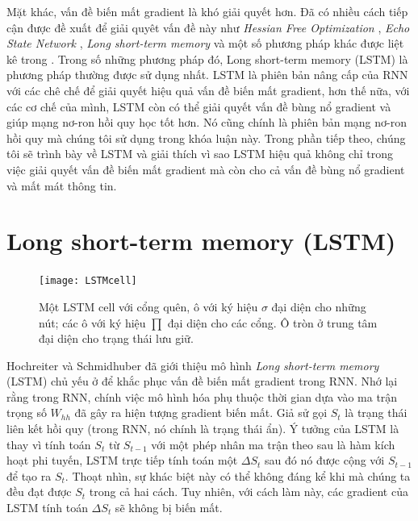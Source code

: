 Mặt khác, vấn đề biến mất gradient là khó giải quyết hơn. Đã có nhiều cách tiếp cận được đề xuất để giải quyêt vấn đề này như \textit{Hessian Free Optimization} \cite{martens2011}, \textit{Echo State Network} \cite{jaeger2007}, \textit{Long short-term memory} \cite{hochreiter1997} và một số phương pháp khác được liệt kê trong \cite{bengio2013}. Trong số những phương pháp đó, Long short-term memory (LSTM) là phương pháp thường được sử dụng nhất. LSTM là phiên bản nâng cấp của RNN với các chê chế để giải quyết hiệu quả vấn đề biến mất gradient, hơn thế nữa, với các cơ chế của mình, LSTM còn có thể giải quyết vấn đề bùng nổ gradient và giúp mạng nơ-ron hồi quy học tốt hơn. Nó cũng chính là phiên bản mạng nơ-ron hồi quy mà chúng tôi sử dụng trong khóa luận này. Trong phần tiếp theo, chúng tôi sẽ trình bày về LSTM và giải thích vì sao LSTM hiệu quả không chỉ trong việc giải quyết vấn đề biến mất gradient mà còn cho cả vấn đề bùng nổ gradient và mất mát thông tin.

\section{Long short-term memory (LSTM)}

\begin{figure}
	\centering
	\texttt{[image: LSTMcell]}
	\caption[Một LSTM cell]{Một LSTM cell với cổng quên, ô với ký hiệu $\sigma$ đại diện cho những nút; các ô với ký hiệu $\prod$ đại diện cho các cổng. Ô tròn ở trung tâm đại diện cho trạng thái lưu giữ.}
	\label{fig_lstmCell}
\end{figure}

Hochreiter và Schmidhuber \cite{hochreiter1997} đã giới thiệu mô hình \textit{Long short-term memory} (LSTM) chủ yếu ở để khắc phục vấn đề biến mất gradient trong RNN. Nhớ lại rằng trong RNN, chính việc mô hình hóa phụ thuộc thời gian dựa vào ma trận trọng số $W_{hh}$ đã gây ra hiện tượng gradient biến mất. Giả sử gọi $S_t$ là trạng thái liên kết hồi quy (trong RNN, nó chính là trạng thái ẩn). Ý tưởng của LSTM là thay vì tính toán $S_t$ từ $S_{t-1}$ với một phép nhân ma trận theo sau là hàm kích hoạt phi tuyến, LSTM trực tiếp tính toán một $\Delta S_t$ sau đó nó được cộng với $S_{t-1}$ để tạo ra $S_t$. Thoạt nhìn, sự khác biệt này có thể không đáng kể khi mà chúng ta đều đạt được $S_t$ trong cả hai cách. Tuy nhiên, với cách làm này, các gradient của LSTM tính toán $\Delta S_t$ sẽ không bị biến mất.

